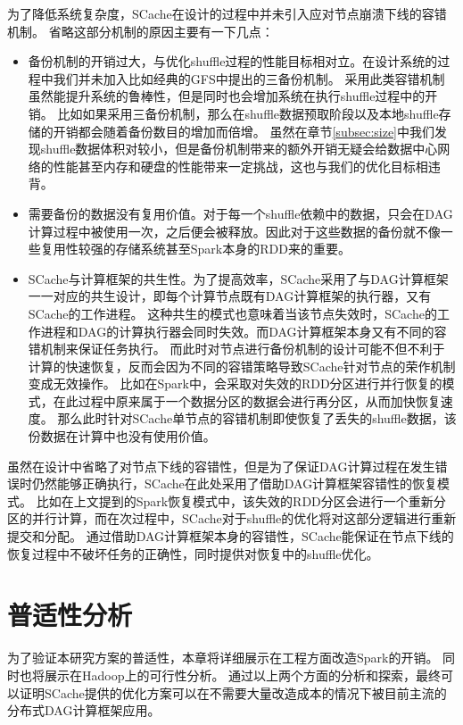 为了降低系统复杂度，SCache在设计的过程中并未引入应对节点崩溃下线的容错机制。
省略这部分机制的原因主要有一下几点：
\begin{itemize}
    \item 备份机制的开销过大，与优化shuffle过程的性能目标相对立。在设计系统的过程中我们并未加入比如经典的GFS\cite{gfs}中提出的三备份机制。
    采用此类容错机制虽然能提升系统的鲁棒性，但是同时也会增加系统在执行shuffle过程中的开销。
    比如如果采用三备份机制，那么在shuffle数据预取阶段以及本地shuffle存储的开销都会随着备份数目的增加而倍增。
    虽然在章节\ref{subsec:size}中我们发现shuffle数据体积对较小，但是备份机制带来的额外开销无疑会给数据中心网络的性能甚至内存和硬盘的性能带来一定挑战，这也与我们的优化目标相违背。
    \item 需要备份的数据没有复用价值。对于每一个shuffle依赖中的数据，只会在DAG计算过程中被使用一次，之后便会被释放。因此对于这些数据的备份就不像一些复用性较强的存储系统甚至Spark本身的RDD来的重要。
    \item SCache与计算框架的共生性。为了提高效率，SCache采用了与DAG计算框架一一对应的共生设计，即每个计算节点既有DAG计算框架的执行器，又有SCache的工作进程。
    这种共生的模式也意味着当该节点失效时，SCache的工作进程和DAG的计算执行器会同时失效。而DAG计算框架本身又有不同的容错机制来保证任务执行。
    而此时对节点进行备份机制的设计可能不但不利于计算的快速恢复，反而会因为不同的容错策略导致SCache针对节点的荣作机制变成无效操作。
    比如在Spark中，会采取对失效的RDD分区进行并行恢复的模式，在此过程中原来属于一个数据分区的数据会进行再分区，从而加快恢复速度。
    那么此时针对SCache单节点的容错机制即使恢复了丢失的shuffle数据，该份数据在计算中也没有使用价值。
\end{itemize}

虽然在设计中省略了对节点下线的容错性，但是为了保证DAG计算过程在发生错误时仍然能够正确执行，SCache在此处采用了借助DAG计算框架容错性的恢复模式。
比如在上文提到的Spark恢复模式中，该失效的RDD分区会进行一个重新分区的并行计算，而在次过程中，SCache对于shuffle的优化将对这部分逻辑进行重新提交和分配。
通过借助DAG计算框架本身的容错性，SCache能保证在节点下线的恢复过程中不破坏任务的正确性，同时提供对恢复中的shuffle优化。

\section{普适性分析}

为了验证本研究方案的普适性，本章将详细展示在工程方面改造Spark的开销。
同时也将展示在Hadoop上的可行性分析。
通过以上两个方面的分析和探索，最终可以证明SCache提供的优化方案可以在不需要大量改造成本的情况下被目前主流的分布式DAG计算框架应用。

